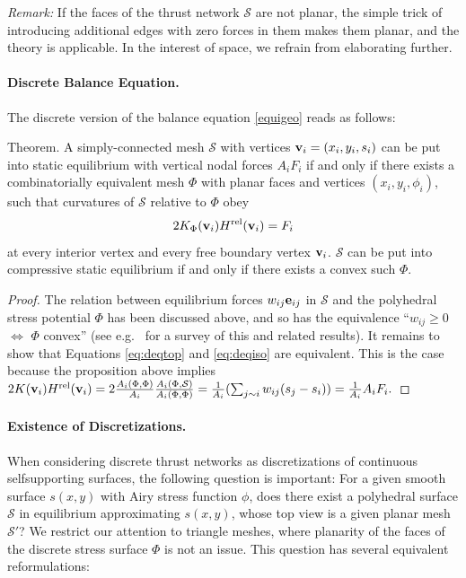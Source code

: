 \documentclass[review]{acmsiggraph}
\def\rel{{\mathord{{\rm rel}}}}
\def\SS{{\mathcal S}}
\begin{document}
{\em Remark:} If the faces of the thrust network $\SS$ are not planar,
the simple trick of introducing additional edges with zero forces in them
makes them planar, and the theory is applicable. In the interest of space, we refrain from elaborating further.


\paragraph{Discrete Balance Equation.}

The discrete version of the balance equation \eqref{equigeo} reads as
follows:

\proclaim Theorem.
 A simply-connected mesh $\SS$ with vertices ${\mathbf v}_i=(x_i,y_i,s_i)$
can be put into static equilibrium with vertical nodal forces $A_iF_i$ if
and only if there exists a combinatorially equivalent mesh $\Phi$ with
planar faces and vertices $(x_i,y_i,\phi_i)$, such that curvatures of
$\SS$ relative to $\Phi$ obey
	\begin{equation}
	2 K_\Phi(\vw_i) H^\rel(\vw_i) = F_i
	\label{eq:deqiso}
	\end{equation}
 at every interior vertex and every free boundary vertex ${\mathbf v}_i$. $\SS$
can be put into compressive static equilibrium if and only if there exists
a convex such $\Phi$.

\begin{proof} The relation between equilibrium forces $w_{ij}{\mathbf e}_{ij}$ in
$\SS$ and the polyhedral stress potential $\Phi$ has been discussed above,
and so has the equivalence ``$w_{ij}\ge 0$ $\iff$ $\Phi$ convex'' (see
e.g.\ \cite{Ash1988} for a survey of this and related results). It remains
to show that Equations \eqref{eq:deqtop} and \eqref{eq:deqiso} are
equivalent. This is the case because the proposition above implies
	$
	2 K(\vw_i) H^\rel(\vw_i) =
	2 \frac{A_i(\Phi,\Phi)}{A_i}
	\frac{A_i(\Phi,\SS)}{A_i(\Phi,\Phi)} =
	{1\over A_i}
	(\sum_{j\sim i} w_{ij} (s_j-s_i))
	= {1\over A_i} A_i F_i.
	$
	\end{proof}

\paragraph{Existence of Discretizations.}

When considering discrete thrust networks as discretizations of continuous
self\dash supporting surfaces, the following question is important: For a
given smooth surface $s(x,y)$ with Airy stress function $\phi$, does there
exist a polyhedral surface $\SS$ in equilibrium approximating $s(x,y)$,
whose top view is a given planar mesh $\SS'$? We restrict our attention to
triangle meshes, where planarity of the faces of the discrete stress
surface $\Phi$ is not an issue. This question has several equivalent
reformulations:
\end{document}

